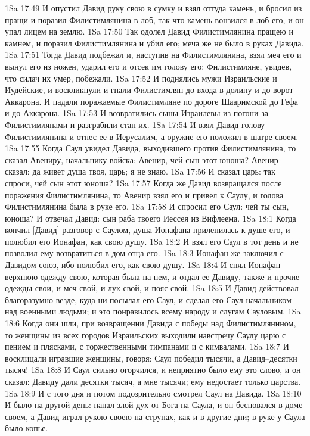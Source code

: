 1Sa 17:49  И опустил Давид руку свою в сумку и взял оттуда камень, и бросил из пращи и поразил Филистимлянина в лоб, так что камень вонзился в лоб его, и он упал лицем на землю.
1Sa 17:50  Так одолел Давид Филистимлянина пращею и камнем, и поразил Филистимлянина и убил его; меча же не было в руках Давида.
1Sa 17:51  Тогда Давид подбежал и, наступив на Филистимлянина, взял меч его и вынул его из ножен, ударил его и отсек им голову его; Филистимляне, увидев, что силач их умер, побежали.
1Sa 17:52  И поднялись мужи Израильские и Иудейские, и воскликнули и гнали Филистимлян до входа в долину и до ворот Аккарона. И падали поражаемые Филистимляне по дороге Шааримской до Гефа и до Аккарона.
1Sa 17:53  И возвратились сыны Израилевы из погони за Филистимлянами и разграбили стан их.
1Sa 17:54  И взял Давид голову Филистимлянина и отнес ее в Иерусалим, а оружие его положил в шатре своем.
1Sa 17:55  Когда Саул увидел Давида, выходившего против Филистимлянина, то сказал Авениру, начальнику войска: Авенир, чей сын этот юноша? Авенир сказал: да живет душа твоя, царь; я не знаю.
1Sa 17:56  И сказал царь: так спроси, чей сын этот юноша?
1Sa 17:57  Когда же Давид возвращался после поражения Филистимлянина, то Авенир взял его и привел к Саулу, и голова Филистимлянина была в руке его.
1Sa 17:58  И спросил его Саул: чей ты сын, юноша? И отвечал Давид: сын раба твоего Иессея из Вифлеема.
1Sa 18:1  Когда кончил [Давид] разговор с Саулом, душа Ионафана прилепилась к душе его, и полюбил его Ионафан, как свою душу.
1Sa 18:2  И взял его Саул в тот день и не позволил ему возвратиться в дом отца его.
1Sa 18:3  Ионафан же заключил с Давидом союз, ибо полюбил его, как свою душу.
1Sa 18:4  И снял Ионафан верхнюю одежду свою, которая была на нем, и отдал ее Давиду, также и прочие одежды свои, и меч свой, и лук свой, и пояс свой.
1Sa 18:5  И Давид действовал благоразумно везде, куда ни посылал его Саул, и сделал его Саул начальником над военными людьми; и это понравилось всему народу и слугам Сауловым.
1Sa 18:6  Когда они шли, при возвращении Давида с победы над Филистимлянином, то женщины из всех городов Израильских выходили навстречу Саулу царю с пением и плясками, с торжественными тимпанами и с кимвалами.
1Sa 18:7  И восклицали игравшие женщины, говоря: Саул победил тысячи, а Давид--десятки тысяч!
1Sa 18:8  И Саул сильно огорчился, и неприятно было ему это слово, и он сказал: Давиду дали десятки тысяч, а мне тысячи; ему недостает только царства.
1Sa 18:9  И с того дня и потом подозрительно смотрел Саул на Давида.
1Sa 18:10  И было на другой день: напал злой дух от Бога на Саула, и он бесновался в доме своем, а Давид играл рукою своею на струнах, как и в другие дни; в руке у Саула было копье.
